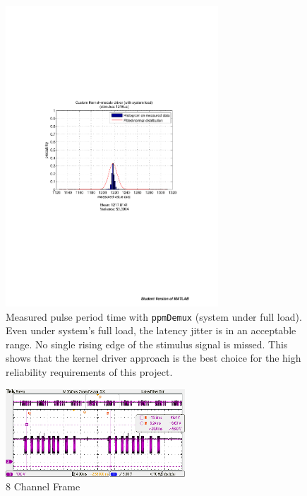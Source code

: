 \begin{figure}[H]
    \centering
    \includegraphics[width=0.71\textwidth]{fig/ch-ppm-kernel-driver/customKern_withLoad}
    \caption[Measured pulse period time with \texttt{ppmDemux} (system under full load)]{Measured pulse period time with \texttt{ppmDemux} (system under full load). Even under system's full load, the latency jitter is in an acceptable range. No single rising edge of the stimulus signal is missed. This shows that the kernel driver approach is the best choice for the high reliability requirements of this project.}
    \label{fig:remoteControl:results:customKernLoad}
\end{figure}

\begin{figure}[H]
	\centering
	\includegraphics[width=0.6\textwidth]{fig_motor/Controller_Treiber/GraupnerGR16_8_Frame.png}
	\caption[8 Channel Frame]{8 Channel Frame}
\end{figure}


